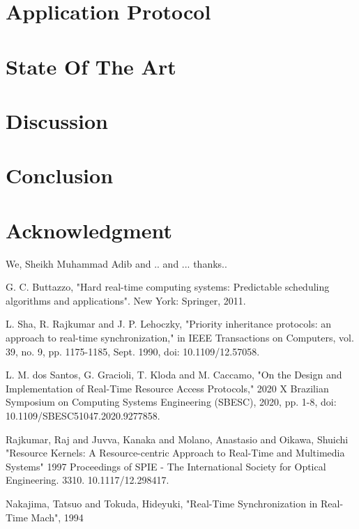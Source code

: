 \documentclass[conference]{IEEEtran}
\begin{document}
\section{Application Protocol}


\section{State Of The Art}



\section{Discussion}

\section{Conclusion}

\section*{Acknowledgment}

We, Sheikh Muhammad Adib  and .. and ... thanks..

\begin{thebibliography}{00}
 G. C. Buttazzo, "Hard real-time computing systems: Predictable scheduling algorithms and applications". New York: Springer, 2011. 

 L. Sha, R. Rajkumar and J. P. Lehoczky, "Priority inheritance protocols: an approach to real-time synchronization," in IEEE Transactions on Computers, vol. 39, no. 9, pp. 1175-1185, Sept. 1990, doi: 10.1109/12.57058.

 L. M. dos Santos, G. Gracioli, T. Kloda and M. Caccamo, "On the Design and Implementation of Real-Time Resource Access Protocols," 2020 X Brazilian Symposium on Computing Systems Engineering (SBESC), 2020, pp. 1-8, doi: 10.1109/SBESC51047.2020.9277858.

 Rajkumar, Raj and Juvva, Kanaka and Molano, Anastasio and Oikawa, Shuichi "Resource Kernels: A Resource-centric Approach to Real-Time and Multimedia Systems" 1997 Proceedings of SPIE - The International Society for Optical Engineering. 3310. 10.1117/12.298417. 

 Nakajima, Tatsuo and Tokuda, Hideyuki, "Real-Time Synchronization in Real-Time Mach", 1994 
\end{thebibliography}
\end{document}
